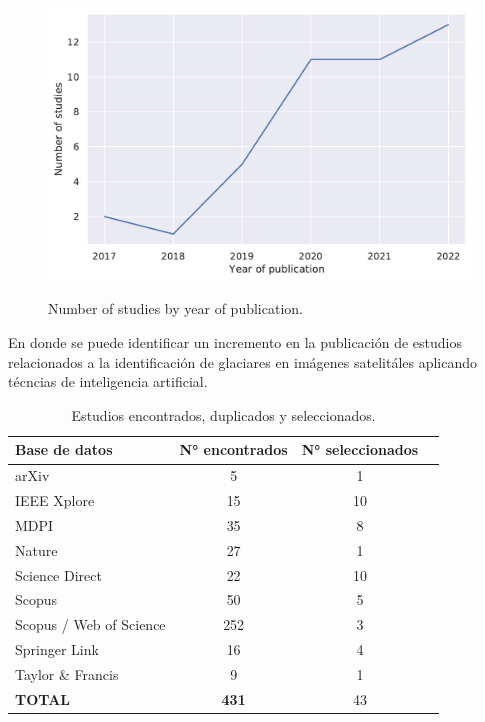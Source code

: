 \documentclass{article}
\begin{document}
\begin{figure}[H]
    \centering
    \includegraphics[width=.65\textwidth]{images/fr_years.pdf}
    \label{fig:fr_years}
    \caption{Number of studies by year of publication.}
\end{figure}
En donde se puede identificar un incremento en la publicación de estudios relacionados a la identificación de glaciares en imágenes satelitáles aplicando técncias de inteligencia artificial.



\begin{table}[H]
    \centering
    \caption{Estudios encontrados, duplicados y seleccionados.}
    \hspace{1cm}
    \label{tab:result}
    \begin{tabularx}{\textwidth}{Xccc}
        \hline
        \textbf{Base de datos}  & \textbf{N° encontrados} & \textbf{N° seleccionados} \\ \hline
        {arXiv}                 & 5                       & 1                         \\
        IEEE Xplore             & 15                      & 10                        \\
        MDPI                    & 35                      & 8                         \\
        Nature                  & 27                      & 1                         \\
        Science Direct          & 22                      & 10                        \\
        Scopus                  & 50                      & 5                         \\
        Scopus / Web of Science & 252                     & 3                         \\
        Springer Link           & 16                      & 4                         \\
        Taylor \& Francis       & 9                       & 1                         \\ \hline
        \textbf{TOTAL}          & \textbf{431}            & 43                        \\ \hline
    \end{tabularx}
\end{table}
\end{document}
